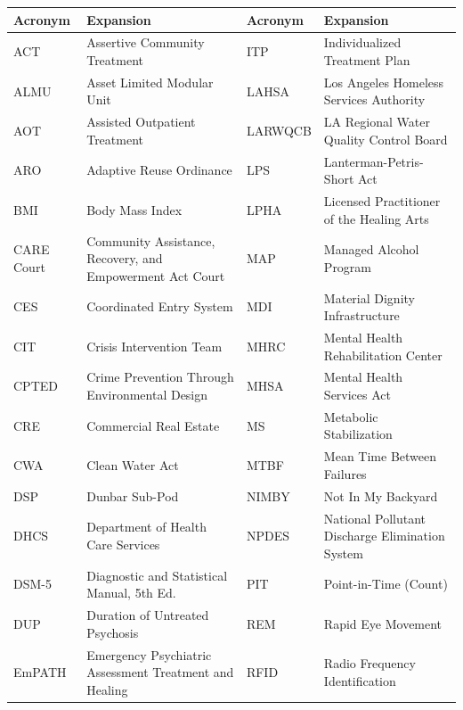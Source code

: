 {{\singlespacing\small
\begin{tabularx}{\textwidth}{@{}p{1.5cm}Xp{1.9cm}X@{}}
\toprule
\rowcolor{rowgray}
\textbf{Acronym} & \textbf{Expansion} & \textbf{Acronym} & \textbf{Expansion} \\
\midrule
ACT      & Assertive Community Treatment              & ITP     & Individualized Treatment Plan \\
\rowcolor{rowgray}
ALMU     & Asset Limited Modular Unit                 & LAHSA   & Los Angeles Homeless Services Authority \\
AOT      & Assisted Outpatient Treatment              & LARWQCB & LA Regional Water Quality Control Board \\
\rowcolor{rowgray}
ARO      & Adaptive Reuse Ordinance                   & LPS     & Lanterman-Petris-Short Act \\
BMI      & Body Mass Index                            & LPHA    & Licensed Practitioner of the Healing Arts \\
\rowcolor{rowgray}
CARE Court & Community Assistance, Recovery, and Empowerment Act Court & MAP & Managed Alcohol Program \\
CES      & Coordinated Entry System                   & MDI     & Material Dignity Infrastructure \\
\rowcolor{rowgray}
CIT      & Crisis Intervention Team                   & MHRC    & Mental Health Rehabilitation Center \\
CPTED    & Crime Prevention Through Environmental Design & MHSA & Mental Health Services Act \\
\rowcolor{rowgray}
CRE      & Commercial Real Estate                     & MS      & Metabolic Stabilization \\
CWA      & Clean Water Act                            & MTBF    & Mean Time Between Failures \\
\rowcolor{rowgray}
DSP      & Dunbar Sub-Pod                             & NIMBY   & Not In My Backyard \\
DHCS     & Department of Health Care Services         & NPDES   & National Pollutant Discharge Elimination System \\
\rowcolor{rowgray}
DSM-5    & Diagnostic and Statistical Manual, 5th Ed. & PIT    & Point-in-Time (Count) \\
DUP      & Duration of Untreated Psychosis            & REM     & Rapid Eye Movement \\
\rowcolor{rowgray}
EmPATH   & Emergency Psychiatric Assessment Treatment and Healing & RFID & Radio Frequency Identification \\

\end{tabularx}}}
